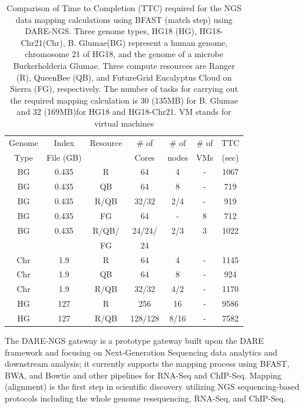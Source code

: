 \documentclass[]{svjour3}
\begin{document}
\begin{table}
\centering
\scriptsize
 \begin{tabular}{|c|c|c|c|c|c|c|} 
 \hline 
Genome & Index         & Resource    & \# of & \# of &   \# of         &	TTC  \\
  Type               & File (GB)        & &Cores &   nodes &  VMs&  (sec)\\  
  \hline
 BG &0.435& R&	64 &4&-	&1067 \\
\hline                  
BG &0.435& QB	&	64& 8&-	&719 \\
\hline
 BG &0.435&R/QB	&	32/32 &2/4& -&919 \\
\hline
 BG &0.435& FG &	64 &-&8	&712 \\
\hline
 BG &0.435 &  R/QB/ &	24/24/& 2/3 & 3 &1022\\
 & & FG& 24 &&&\\
\hline
\hline
Chr &1.9& R	&	64& 4 &-&1145 \\
\hline
Chr &1.9& QB	&	64&8&-	&924 \\
\hline
Chr &1.9& R/QB	&	32/32& 4/2&	-&1170 \\
\hline
\hline
HG &127& R	&	256 & 16 &-	&9586\\
\hline
HG &127& R/QB	&	128/128&8/16 & -&7582 \\
\hline
\end{tabular}
\caption{
  Comparison of Time to Completion (TTC) required for the NGS data
  mapping calculations using BFAST (match step) using DARE-NGS. 
  Three genome types,
  HG18 (HG), HG18-Chr21(Chr), B. Glumae(BG) represent a human genome,
  chromosome 21 of HG18, and the genome of a microbe Burkerholderia
  Glumae. Three compute resources are Ranger (R), QueenBee (QB), and
  FutureGrid  Eucalyptus Cloud on Sierra (FG), respectively. The
  number of tasks for carrying out the required mapping calculation is
  30 (135MB) for B. Glumae and 32 (169MB)for HG18 and HG18-Chr21. VM stands for virtual machines
}

  \label{table:NGS-Distributed} 
\end{table}

The DARE-NGS gateway %
is a prototype gateway built upon the DARE framework and focusing on
Next-Generation Sequencing data analytics and downstream analysis; it
currently supports the mapping process using BFAST, BWA, and Bowtie
and other pipelines for RNA-Seq and
ChIP-Seq\cite{mardis2008-arghg,ecmls_ccpe10}. Mapping (alignment) is
the first step in scientific discovery utilizing NGS sequencing-based
protocols including the whole genome resequencing, RNA-Seq, and
ChIP-Seq.
\end{document}
